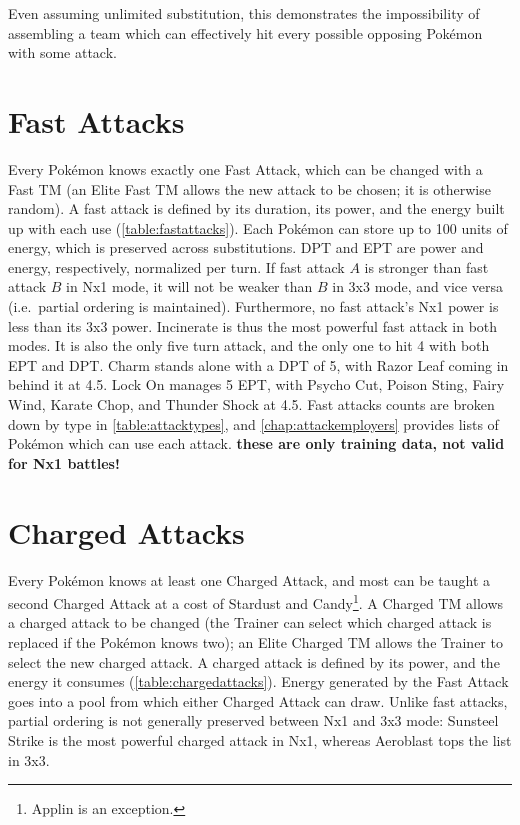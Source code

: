 Even assuming unlimited substitution, this demonstrates the
  impossibility of assembling a team which can effectively
  hit every possible opposing Pokémon with some attack.

\section{Fast Attacks}
Every Pokémon knows exactly one Fast Attack, which can be changed with a Fast TM
 (an Elite Fast TM allows the new attack to be chosen; it is otherwise random).
A fast attack is defined by its duration, its power, and the energy built up with each use (\autoref{table:fastattacks}).
Each Pokémon can store up to 100 units of energy, which is preserved across substitutions.
DPT and EPT are power and energy, respectively, normalized per turn.
If fast attack $A$ is stronger than fast attack $B$ in Nx1 mode, it will not be
  weaker than $B$ in 3x3 mode, and vice versa (i.e.\ partial ordering is maintained).
Furthermore, no fast attack's Nx1 power is less than its 3x3 power.
Incinerate is thus the most powerful fast attack in both modes.
It is also the only five turn attack, and the only one to hit 4 with both EPT and DPT\@.
Charm stands alone with a DPT of 5, with Razor Leaf coming in behind it at 4.5.
Lock On manages 5 EPT, with Psycho Cut, Poison Sting, Fairy Wind, Karate Chop,
  and Thunder Shock at 4.5.
Fast attacks counts are broken down by type in \autoref{table:attacktypes},
 and \autoref{chap:attackemployers} provides lists of Pokémon which can use each attack.
  \textbf{these are only training data, not valid for Nx1 battles!}



\section{Charged Attacks}
Every Pokémon knows at least one Charged Attack, and most can be taught a second
  Charged Attack at a cost of Stardust and Candy\footnote{Applin is an exception.}.
A Charged TM allows a charged attack to be changed (the Trainer can select
  which charged attack is replaced if the Pokémon knows two);
  an Elite Charged TM allows the Trainer to select the new charged attack.
A charged attack is defined by its power, and the energy it consumes (\autoref{table:chargedattacks}).
Energy generated by the Fast Attack goes into a pool from which either Charged Attack can draw.
Unlike fast attacks, partial ordering is not generally preserved between Nx1 and 3x3 mode:
  Sunsteel Strike is the most powerful charged attack in Nx1, whereas Aeroblast tops
  the list in 3x3.


